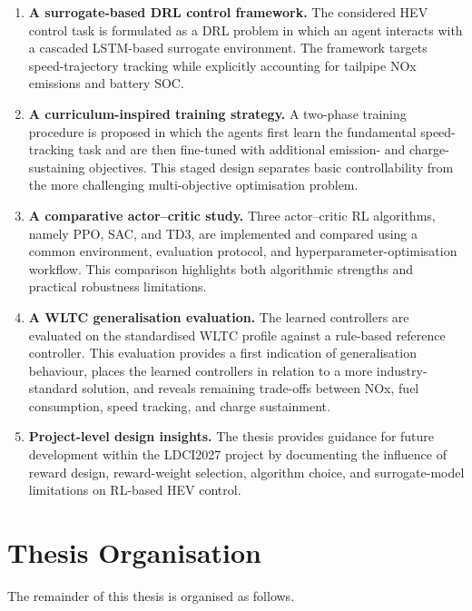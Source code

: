 \begin{enumerate}
  \item \textbf{A surrogate-based \ac{DRL} control framework.} The considered \ac{HEV} control task is formulated as a \ac{DRL} problem in which an agent interacts with a cascaded \ac{LSTM}-based surrogate environment. The framework targets speed-trajectory tracking while explicitly accounting for tailpipe \ac{NOx} emissions and battery \ac{SOC}.
  \item \textbf{A curriculum-inspired training strategy.} A two-phase training procedure is proposed in which the agents first learn the fundamental speed-tracking task and are then fine-tuned with additional emission- and charge-sustaining objectives. This staged design separates basic controllability from the more challenging multi-objective optimisation problem.
  \item \textbf{A comparative actor--critic study.} Three actor--critic \ac{RL} algorithms, namely \ac{PPO}, \ac{SAC}, and \ac{TD3}, are implemented and compared using a common environment, evaluation protocol, and hyperparameter-optimisation workflow. This comparison highlights both algorithmic strengths and practical robustness limitations.
  \item \textbf{A WLTC generalisation evaluation.} The learned controllers are evaluated on the standardised \ac{WLTC} profile against a rule-based reference controller. This evaluation provides a first indication of generalisation behaviour, places the learned controllers in relation to a more industry-standard solution, and reveals remaining trade-offs between \ac{NOx}, fuel consumption, speed tracking, and charge sustainment.
  \item \textbf{Project-level design insights.} The thesis provides guidance for future development within the \ac{LDCI2027} project by documenting the influence of reward design, reward-weight selection, algorithm choice, and surrogate-model limitations on \ac{RL}-based \ac{HEV} control.
\end{enumerate}

\section{Thesis Organisation}
The remainder of this thesis is organised as follows.

